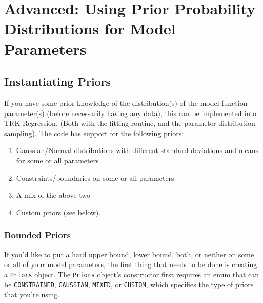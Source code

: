 \documentclass[12pt]{article}
\newcommand{\li}{\lstinline}
\begin{document}
\section{Advanced: Using Prior Probability Distributions for Model Parameters}

\subsection{Instantiating Priors}

\par If you have some prior knowledge of the distribution(s) of the model function parameter(s) (before necessarily having any data), this can be implemented into TRK Regression. (Both with the fitting routine, and the parameter distribution sampling). The code has support for the following priors:
\begin{enumerate}
	\item Gaussian/Normal distributions with different standard deviations and means for some or all parameters
	\item Constraints/boundaries on some or all parameters
	\item A mix of the above two
	\item Custom priors (see below).
\end{enumerate} 
\subsubsection{Bounded Priors}
If you'd like to put a hard upper bound, lower bound, both, or neither on some or all of your model parameters, the first thing that needs to be done is creating a \lstinline{Priors} object. The \li{Priors} object's constructor first requires an enum that can be \li{CONSTRAINED}, \li{GAUSSIAN}, \li{MIXED}, or \li{CUSTOM}, which specifies the type of priors that you're using. 
\end{document}
